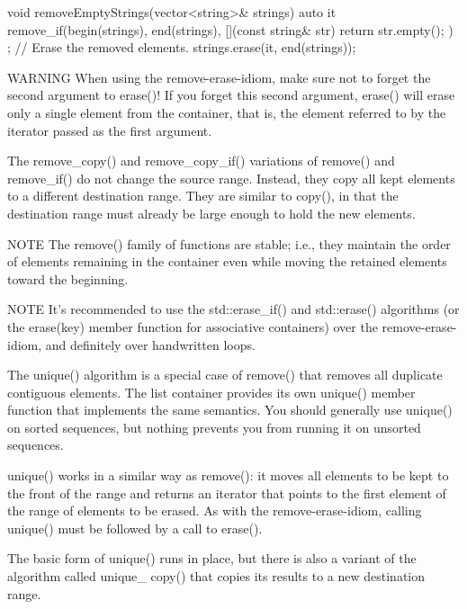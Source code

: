 \begin{cpp}
void removeEmptyStrings(vector<string>& strings)
{
    auto it { remove_if(begin(strings), end(strings),
        [](const string& str){ return str.empty(); }) };
    // Erase the removed elements.
    strings.erase(it, end(strings));
}
\end{cpp}

\begin{myWarning}{WARNING}
When using the remove-erase-idiom, make sure not to forget the second argument to erase()! If you forget this second argument, erase() will erase only a single element from the container, that is, the element referred to by the iterator passed as the first argument.
\end{myWarning}

The remove\_copy() and remove\_copy\_if() variations of remove() and remove\_if() do not change the source range. Instead, they copy all kept elements to a different destination range. They are similar to copy(), in that the destination range must already be large enough to hold the new elements.

\begin{myNotic}{NOTE}
The remove() family of functions are stable; i.e., they maintain the order of elements remaining in the container even while moving the retained elements toward the beginning.
\end{myNotic}

\begin{myNotic}{NOTE}
It’s recommended to use the std::erase\_if() and std::erase() algorithms (or the erase(key) member function for associative containers) over the remove-erase-idiom, and definitely over handwritten loops.
\end{myNotic}


The unique() algorithm is a special case of remove() that removes all duplicate contiguous elements. The list container provides its own unique() member function that implements the same semantics. You should generally use unique() on sorted sequences, but nothing prevents you from running it on unsorted sequences.

unique() works in a similar way as remove(): it moves all elements to be kept to the front of the range and returns an iterator that points to the first element of the range of elements to be erased. As with the remove-erase-idiom, calling unique() must be followed by a call to erase().

The basic form of unique() runs in place, but there is also a variant of the algorithm called unique\_ copy() that copies its results to a new destination range.

